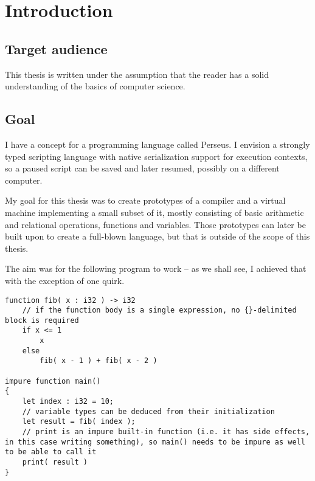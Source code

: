 
\chapter{Introduction} %

    
    \section{Target audience}
    This thesis is written under the assumption that the reader has a solid understanding of the basics of computer science.

	\section{Goal} %
	
	I have a concept for a programming language called Perseus. I envision a strongly typed scripting language with native serialization support for execution contexts, so a paused script can be saved and later resumed, possibly on a different computer.
	
	My goal for this thesis was to create prototypes of a compiler and a virtual machine implementing a small subset of it, mostly consisting of basic arithmetic and relational operations, functions and variables. Those prototypes can later be built upon to create a full-blown language, but that is outside of the scope of this thesis.
	
	The aim was for the following program to work -- as we shall see, I achieved that with the exception of one quirk.
	
	\lstperseus
	\begin{lstlisting}[caption={Desired target language}]
function fib( x : i32 ) -> i32
    // if the function body is a single expression, no {}-delimited block is required
    if x <= 1
        x
    else
        fib( x - 1 ) + fib( x - 2 )

impure function main()
{
	let index : i32 = 10;
	// variable types can be deduced from their initialization
	let result = fib( index );
	// print is an impure built-in function (i.e. it has side effects, in this case writing something), so main() needs to be impure as well to be able to call it
	print( result )
}
	\end{lstlisting}
	
